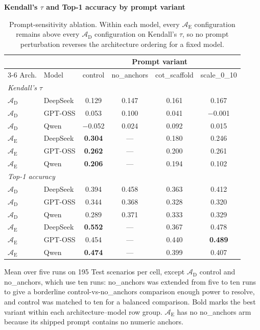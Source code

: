 \documentclass[a4paper,fleqn]{cas-dc}
\begin{document}
\begin{table}[htbp]
\begin{threeparttable}
\footnotesize
\centering
\textbf{Kendall's $\tau$ and Top-1 accuracy by prompt variant}
\renewcommand{\arraystretch}{1.15}
\setlength{\tabcolsep}{4pt}
\begin{tabular}{llcccc}
\toprule
& & \multicolumn{4}{c}{Prompt variant} \\
\cmidrule(lr){3-6}
Arch. & Model & control & no\_anchors & cot\_scaffold & scale\_0\_10 \\
\midrule
\multicolumn{6}{l}{\emph{Kendall's $\tau$}} \\
$\mathcal{A}_{\text{D}}$ & DeepSeek & 0.129 & 0.147 & 0.161 & 0.167 \\
$\mathcal{A}_{\text{D}}$ & GPT-OSS  & 0.053 & 0.100 & 0.041 & $-$0.001 \\
$\mathcal{A}_{\text{D}}$ & Qwen     & $-$0.052 & 0.024 & 0.092 & 0.015 \\
$\mathcal{A}_{\text{E}}$ & DeepSeek & \textbf{0.304} & --- & 0.180 & 0.246 \\
$\mathcal{A}_{\text{E}}$ & GPT-OSS  & \textbf{0.262} & --- & 0.200 & 0.261 \\
$\mathcal{A}_{\text{E}}$ & Qwen     & \textbf{0.206} & --- & 0.194 & 0.102 \\
\midrule
\multicolumn{6}{l}{\emph{Top-1 accuracy}} \\
$\mathcal{A}_{\text{D}}$ & DeepSeek & 0.394 & 0.458 & 0.363 & 0.412 \\
$\mathcal{A}_{\text{D}}$ & GPT-OSS  & 0.344 & 0.368 & 0.328 & 0.320 \\
$\mathcal{A}_{\text{D}}$ & Qwen     & 0.289 & 0.371 & 0.333 & 0.329 \\
$\mathcal{A}_{\text{E}}$ & DeepSeek & \textbf{0.552} & --- & 0.367 & 0.478 \\
$\mathcal{A}_{\text{E}}$ & GPT-OSS  & 0.454 & --- & 0.440 & \textbf{0.489} \\
$\mathcal{A}_{\text{E}}$ & Qwen     & \textbf{0.474} & --- & 0.399 & 0.407 \\
\bottomrule
\end{tabular}
\setlength{\tabcolsep}{6pt}
\renewcommand{\arraystretch}{1.0}
\begin{tablenotes}\footnotesize
\item Mean over five runs on 195 Test scenarios per cell, except $\mathcal{A}_{\text{D}}$ control and no\_anchors, which use ten runs: no\_anchors was extended from five to ten runs to give a borderline control-vs-no\_anchors comparison enough power to resolve, and control was matched to ten for a balanced comparison. Bold marks the best variant within each architecture--model row group. $\mathcal{A}_{\text{E}}$ has no no\_anchors arm because its shipped prompt contains no numeric anchors.
\end{tablenotes}
\end{threeparttable}
\caption{Prompt-sensitivity ablation. Within each model, every $\mathcal{A}_{\text{E}}$ configuration remains above every $\mathcal{A}_{\text{D}}$ configuration on Kendall's $\tau$, so no prompt perturbation reverses the architecture ordering for a fixed model.}
\label{tab:prompt_ablation}
\end{table}
\end{document}
